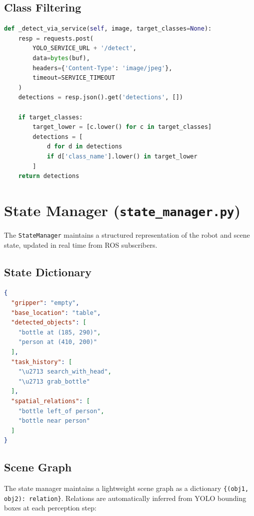 \documentclass[12pt,a4paper]{report}
\begin{document}
\subsection{Class Filtering}

\begin{lstlisting}[language=Python, caption={Client-side class filtering in PerceptionManager.}]
def _detect_via_service(self, image, target_classes=None):
    resp = requests.post(
        YOLO_SERVICE_URL + '/detect',
        data=bytes(buf),
        headers={'Content-Type': 'image/jpeg'},
        timeout=SERVICE_TIMEOUT
    )
    detections = resp.json().get('detections', [])

    if target_classes:
        target_lower = [c.lower() for c in target_classes]
        detections = [
            d for d in detections
            if d['class_name'].lower() in target_lower
        ]
    return detections
\end{lstlisting}

\section{State Manager (\texttt{state\_manager.py})}

The \texttt{StateManager} maintains a structured representation of the robot and scene
state, updated in real time from ROS subscribers.

\subsection{State Dictionary}

\begin{lstlisting}[language=JSON, caption={State dictionary passed to VLM at each step.}]
{
  "gripper": "empty",
  "base_location": "table",
  "detected_objects": [
    "bottle at (185, 290)",
    "person at (410, 200)"
  ],
  "task_history": [
    "\u2713 search_with_head",
    "\u2713 grab_bottle"
  ],
  "spatial_relations": [
    "bottle left_of person",
    "bottle near person"
  ]
}
\end{lstlisting}

\subsection{Scene Graph}

The state manager maintains a lightweight scene graph as a dictionary
\texttt{\{(obj1, obj2): relation\}}.  Relations are automatically inferred from YOLO
bounding boxes at each perception step:
\end{document}
